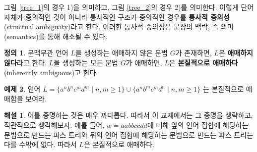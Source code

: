 \documentclass[b5paper, 11pt]{book}
\theoremstyle{definition}
\newtheorem{defn}{정의}[chapter]
\newtheorem{ex}[defn]{예제}
\newtheorem*{ans*}{해설}
\begin{document}
그림 \ref{tree_1}의 경우 1)을 의미하고, 그림 \ref{tree_2}의 경우 2)를 의미한다. 
이렇게 단어 자체가 중의적인 것이 아니라
통사적인 구조가 중의적인 경우를 \textbf{통사적 중의성}(structual ambiguaty)라고 한다. 
이러한 통사적 중의성은 문장의 맥락, 즉 의미(semantics)를 통해 해소될 수 있다.
\begin{defn}
    문맥무관 언어 $L$을 생성하는 애매하지 않은 문법 $G$가 존재하면, $L$은 
    \textbf{애매하지 않다}라고 한다. $L$을 생성하는 모든 문법 $G$가 애매하면,
    $L$은 \textbf{본질적으로 애매하다}(inherently ambiguous)고 한다.
\end{defn} 
\begin{ex}
    언어 $L = \{a^n b^n c^m d^m \; \vert \; n,m \ge 1\} \cup \{a^n b^m c^m d^n \; \vert \; n,m \ge 1\}$
    는 본질적으로 애매함을 보여라.
\end{ex}
\begin{ans*}
    이를 증명하는 것은 매우 까다롭다. 따라서 이 교재에서는 그 증명을 생략하고, 직관적으로 생각해보자. 예를 들어, $w = aabbccdd$에 대해 앞의 언어 집합에 해당하는 문법으로 만드는 파스 트리와 뒤의 언어 집합에 해당하는 문법으로 만드는 파스 트리는 다를 수밖에 없다. 따라서 $L$은 본질적으로 애매하다.
\end{ans*}
\end{document}
